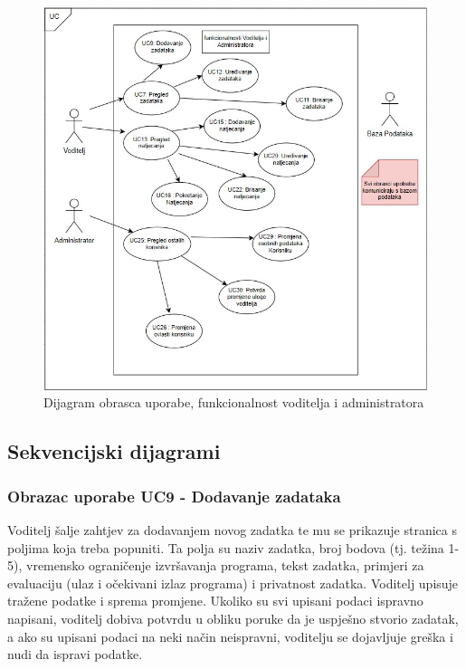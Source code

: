 			\begin{figure}[H]
				\includegraphics[width=\textwidth]{slike/DijagramObrascaUporabe2.jpeg}
				\caption{Dijagram obrasca uporabe, funkcionalnost voditelja i administratora}
				\label{fig:dijaguporab2}
			\end{figure}
		\eject	
		
				
			\subsection{Sekvencijski dijagrami}
			
				
				\subsubsection{Obrazac uporabe UC9 - Dodavanje zadataka}
				
				\noindent Voditelj šalje zahtjev za dodavanjem novog zadatka te mu se prikazuje stranica s poljima koja treba popuniti. Ta polja su naziv zadatka, broj bodova (tj. težina 1-5), vremensko ograničenje izvršavanja programa, tekst zadatka, primjeri za evaluaciju (ulaz i očekivani izlaz programa) i privatnost zadatka. Voditelj upisuje tražene podatke i sprema promjene. Ukoliko su svi upisani podaci ispravno napisani, voditelj dobiva potvrdu u obliku poruke da je uspješno stvorio zadatak, a ako su upisani podaci na neki način neispravni, voditelju se dojavljuje greška i nudi da ispravi podatke. 
				
